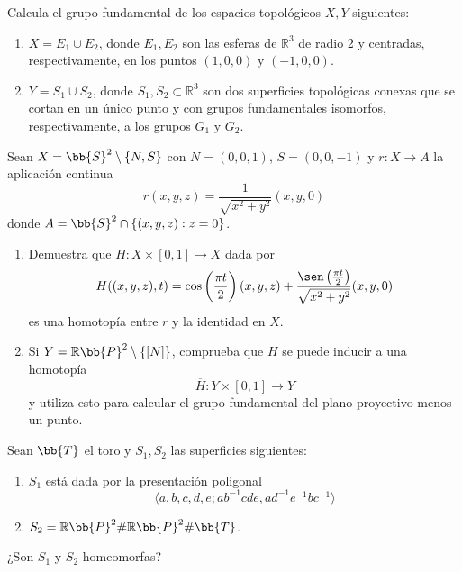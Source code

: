 \documentclass[12pt]{article}
\begin{document}
    \begin{ejercicio}
        Calcula el grupo fundamental de los espacios topológicos $X,Y$ siguientes:
        \begin{enumerate}[label=\alph*)]
            \item $X=E_1\cup E_2$, donde $E_1,E_2$ son las esferas de $\mathbb{R}^3$ de radio 2 y centradas, respectivamente, en los puntos $(1,0,0)$ y $(-1,0,0)$.
            \item $Y = S_1\cup S_2$, donde $S_1,S_2\subset \mathbb{R}^3$ son dos superficies topológicas conexas que se cortan en un único punto y con grupos fundamentales isomorfos, respectivamente, a los grupos $G_1$ y $G_2$.
        \end{enumerate}
    \end{ejercicio}

    \begin{ejercicio}
        Sean $X=\bb{S}^2\setminus \{N,S\}$ con $N = (0,0,1)$, $S=(0,0,-1)$ y $r:X\to A$ la aplicación continua
        \begin{equation*}
            r(x,y,z) = \frac{1}{\sqrt{x^2+y^2}}(x,y,0)
        \end{equation*}
        donde $A=\bb{S}^2\cap \{(x,y,z) : z=0\}$.
        \begin{enumerate}[label=\alph*)]
            \item Demuestra que $H:X\times [0,1]\to X$ dada por
                \begin{equation*}
                    H((x,y,z),t) = \cos\left(\frac{\pi t}{2}\right)(x,y,z) + \frac{\sen\left(\frac{\pi t}{2}\right)}{\sqrt{x^2+y^2}}(x,y,0)
                \end{equation*}
                es una homotopía entre $r$ y la identidad en $X$.
            \item Si $Y=\mathbb{R}\bb{P}^2\setminus \{[N]\}$, comprueba que $H$ se puede inducir a una homotopía
                \begin{equation*}
                    \overline{H}:Y\times [0,1]\to Y
                \end{equation*}
                    y utiliza esto para calcular el grupo fundamental del plano proyectivo menos un punto.
        \end{enumerate}
    \end{ejercicio}

    \begin{ejercicio}
        Sean $\bb{T}$ el toro y $S_1,S_2$ las superficies siguientes:
        \begin{enumerate}[label=\alph*)]
            \item $S_1$ está dada por la presentación poligonal
                \begin{equation*}
                    \langle a,b,c,d,e;ab^{-1}cde, ad^{-1}e^{-1}bc^{-1} \rangle 
                \end{equation*}
            \item $S_2 = \mathbb{R}\bb{P}^2\# \mathbb{R}\bb{P}^2\#\bb{T}$.
        \end{enumerate}
        ¿Son $S_1$ y $S_2$ homeomorfas?
    \end{ejercicio}
\end{document}
